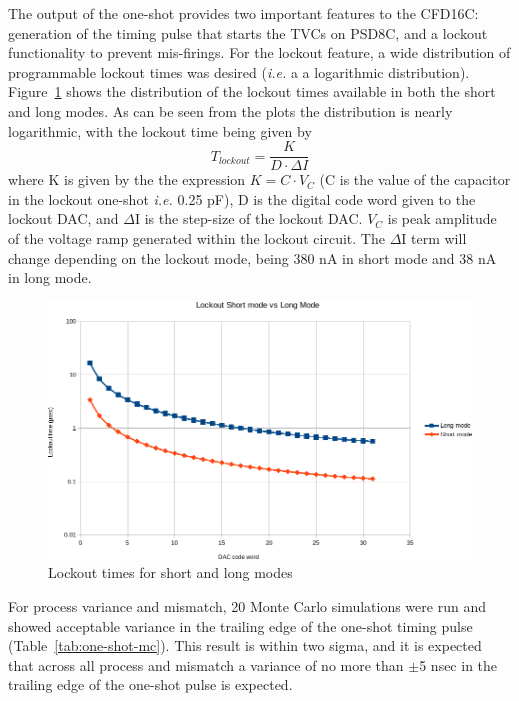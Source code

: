 \documentclass[12pt,oneside,final]{siuethesis}
\theoremstyle{definition}
\begin{document}
\par The output of the one-shot provides two important features to the CFD16C: generation of the timing pulse that starts the TVCs on PSD8C, and a lockout functionality to prevent mis-firings. For the lockout feature, a wide distribution of programmable lockout times was desired (\emph{i.e.} a a logarithmic distribution). Figure~\ref{fig:lockout-spread} shows the distribution of the lockout times available in both the short and long modes. As can be seen from the plots the distribution is nearly logarithmic, with the lockout time being given by 
\begin{equation}
T_{lockout} = \frac{K}{D\cdot \Delta I}
\label{eq:lockout}
\end{equation}
where K is given by the the expression $K = C\cdot V_{C}$ (C is the value of the capacitor in the lockout one-shot \emph{i.e.} 0.25 pF), D is the digital code word given to the lockout DAC, and $\Delta$I is the step-size of the lockout DAC. $V_{C}$ is peak amplitude of the voltage ramp generated within the lockout circuit.  The $\Delta$I term will change depending on the lockout mode, being 380 nA in short mode and 38 nA in long mode. 

\begin{figure}[htbp!]
 \centering
 \includegraphics[scale=.63,keepaspectratio=true]{./ch4_figures/lockout_plot.png}
 \caption{Lockout times for short and long modes}
 \label{fig:lockout-spread}
\end{figure}


\par For process variance and mismatch, 20 Monte Carlo simulations were run and showed acceptable variance in the trailing edge of the one-shot timing pulse (Table~\ref{tab:one-shot-mc}). This result is within two sigma, and it is expected that across all process and mismatch a variance of no more than $\pm$5 nsec in the trailing edge of the one-shot pulse is expected.
\end{document}
